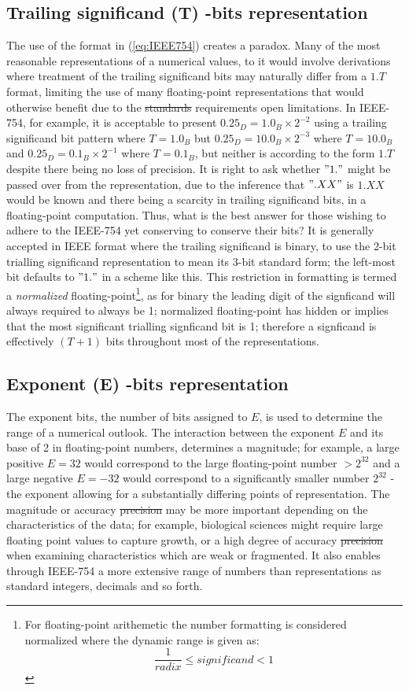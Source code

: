 \documentclass[7pt]{article}
\begin{document}
\subsection*{Trailing significand (T) -bits representation}
The use of the format in (\ref{eq:IEEE754}) creates a paradox. Many of the most reasonable representations of a numerical values, to it would involve derivations where treatment of the trailing significand bits may naturally differ from a $1.T$ format, limiting the use of many floating-point representations that would otherwise benefit due to the \st{standards} requirements open limitations. In IEEE-754, for example, it is acceptable to present $0.25_D = 1.0_B \times 2^{-2}$ using a trailing significand bit pattern where $T=1.0_B$ but $0.25_D = 10.0_B \times 2^{-3}$ where $T=10.0_B$ and $0.25_D = 0.1_B \times 2^{-1}$ where $T= 0.1_B$, but neither is according to the form $1.T$ despite there being no loss of precision. It is right to ask whether $"1."$ might be passed over from the representation, due to the inference that $".XX"$ is $1.XX$ would be known and there	 being a scarcity in trailing significand bits, in a floating-point computation. Thus, what is the best answer for those wishing to adhere to the IEEE-754 yet conserving to conserve their bits? It is generally accepted in IEEE format where the trailing significand is binary, to use the 2-bit trialling significand representation to mean its 3-bit standard form; the left-most bit defaults to $"1."$ in a scheme like this. This restriction in formatting is termed a \textit{normalized} floating-point\footnote{For floating-point arithemetic the number formatting is considered normalized where the dynamic range is given as: $$\dfrac{1}{radix} \leq significand < 1$$}, as for binary the leading digit of the signficand will always required to always be 1; normalized floating-point has hidden or implies that the most significant trialling signficand bit is 1; therefore a signficand is effectively $(T+1)$ bits throughout most of the representations.

\subsection*{Exponent (E) -bits representation}
The exponent bits, the number of bits assigned to $E$, is used to determine the range of a numerical outlook. The interaction between the exponent $E$ and its base of 2 in  floating-point numbers, determines a magnitude; for example, a large positive $E = 32$ would correspond to the large floating-point number $>2^{32}$ and a large negative $E = -32$ would correspond to a significantly smaller number $2^{32}$ - the exponent allowing for a substantially differing points of representation. The magnitude or accuracy \st{precision} may be more important depending on the characteristics of the data; for example, biological sciences might require large floating point values to capture growth, or a high degree of accuracy \st{precision} when examining characteristics which are weak or fragmented. It also enables through IEEE-754 a more extensive range of numbers than representations as standard integers, decimals and so forth.
\end{document}
